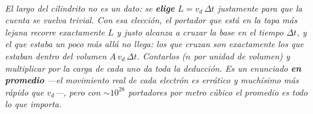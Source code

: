 \begin{center}
\\[0.5em]
{\small\itshape El largo del cilindrito no es un dato: se \textbf{elige}
$L = v_d\,\Delta t$ justamente para que la cuenta se vuelva trivial. Con esa
elección, el portador que está en la tapa más lejana recorre exactamente $L$ y
\emph{justo} alcanza a cruzar la base en el tiempo $\Delta t$, y el que estaba
un poco más allá no llega: los que cruzan son exactamente los que estaban
dentro del volumen $A\,v_d\,\Delta t$. Contarlos ($n$ por unidad de volumen) y
multiplicar por la carga de cada uno da toda la deducción. Es un enunciado
\textbf{en promedio} ---el movimiento real de cada electrón es errático y
muchísimo más rápido que $v_d$---, pero con $\sim10^{28}$ portadores por metro
cúbico el promedio es todo lo que importa.}
\end{center}
